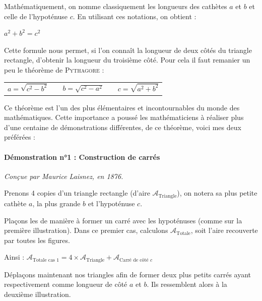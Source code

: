 \documentclass[a4paper, twoside]{article}
\begin{document}
Mathématiquement, on nomme classiquement les longueurs des cathètes $a$ et $b$ et celle
de l'hypoténuse $c$. En utilisant ces notations, on obtient :

\begin{center}
	$a^2 + b^2 = c^2$
\end{center}

Cette formule nous permet, si l'on connaît la longueur de deux côtés du triangle rectangle,
d'obtenir la longueur du troisième côté. Pour cela il faut remanier un peu le théorème de \textsc{Pythagore} :

\begin{center}
	\begin{tabular}{ccccc}
		$a = \sqrt{c^2 - b^2}$ &
		\phantom{text}         &
		$b = \sqrt{c^2 - a^2}$ &
		\phantom{text}         &
		$c = \sqrt{a^2 + b^2}$ \\
	\end{tabular}
\end{center}

\smallbreak

Ce théorème est l'un des plus élémentaires et incontournables du monde des mathématiques. 
Cette importance a poussé les mathématiciens à réaliser plus d'une centaine de démonstrations différentes, 
de ce théorème, voici mes deux préférées :

\paragraph*{Démonstration n°1 : Construction de carrés}

\textit{Conçue par Maurice Laisnez, en 1876.}

Prenons 4 copies d'un triangle rectangle (d'aire $\mathcal{A}_{\text{Triangle}}$), 
on notera sa plus petite cathète $a$, la plus grande $b$ et l'hypoténuse $c$.

Plaçons les de manière à former un carré avec les hypoténuses (comme sur la première illustration).
Dans ce premier cas, calculons $\mathcal{A}_{\text{Totale}}$, soit l'aire recouverte par toutes les figures.

Ainsi : $\mathcal{A}_{\text{Totale cas 1}} = 4 \times \mathcal{A}_{\text{Triangle}} + \mathcal{A}_{\text{Carré de côté }c}$

\medbreak

Déplaçons maintenant nos triangles afin de former deux plus petits carrés ayant respectivement 
comme longueur de côté $a$ et $b$. Ils ressemblent alors à la deuxième illustration. 
\end{document}

